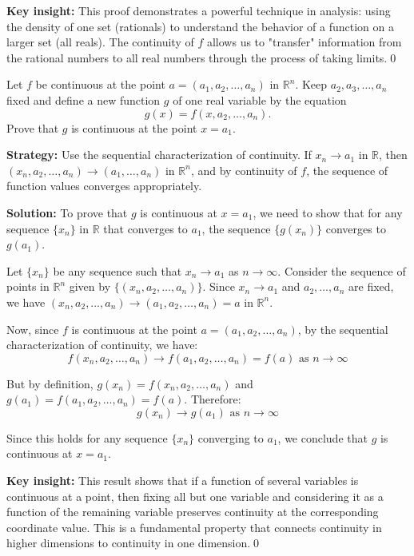 \medskip\noindent\textbf{Key insight:} This proof demonstrates a powerful technique in analysis: using the density of one set (rationals) to understand the behavior of a function on a larger set (all reals). The continuity of $f$ allows us to "transfer" information from the rational numbers to all real numbers through the process of taking limits.\qed



\begin{problembox}
\begin{problemstatement}
Let \( f \) be continuous at the point \( a = (a_1, a_2, \ldots, a_n) \) in \( \mathbb{R}^n \). Keep \( a_2, a_3, \ldots, a_n \) fixed and define a new function \( g \) of one real variable by the equation
\[g(x) = f(x, a_2, \ldots, a_n).\]
Prove that \( g \) is continuous at the point \( x = a_1 \).
\end{problemstatement}
\end{problembox}

\noindent\textbf{Strategy:} Use the sequential characterization of continuity. If $x_n \to a_1$ in $\mathbb{R}$, then $(x_n, a_2, \ldots, a_n) \to (a_1, \ldots, a_n)$ in $\mathbb{R}^n$, and by continuity of $f$, the sequence of function values converges appropriately.

\bigskip\noindent\textbf{Solution:}
To prove that $g$ is continuous at $x = a_1$, we need to show that for any sequence $\{x_n\}$ in $\mathbb{R}$ that converges to $a_1$, the sequence $\{g(x_n)\}$ converges to $g(a_1)$.

Let $\{x_n\}$ be any sequence such that $x_n \to a_1$ as $n \to \infty$. Consider the sequence of points in $\mathbb{R}^n$ given by $\{(x_n, a_2, \ldots, a_n)\}$. Since $x_n \to a_1$ and $a_2, \ldots, a_n$ are fixed, we have $(x_n, a_2, \ldots, a_n) \to (a_1, a_2, \ldots, a_n) = a$ in $\mathbb{R}^n$.

Now, since $f$ is continuous at the point $a = (a_1, a_2, \ldots, a_n)$, by the sequential characterization of continuity, we have:
\[f(x_n, a_2, \ldots, a_n) \to f(a_1, a_2, \ldots, a_n) = f(a) \text{ as } n \to \infty\]

But by definition, $g(x_n) = f(x_n, a_2, \ldots, a_n)$ and $g(a_1) = f(a_1, a_2, \ldots, a_n) = f(a)$. Therefore:
\[g(x_n) \to g(a_1) \text{ as } n \to \infty\]

Since this holds for any sequence $\{x_n\}$ converging to $a_1$, we conclude that $g$ is continuous at $x = a_1$.

\medskip\noindent\textbf{Key insight:} This result shows that if a function of several variables is continuous at a point, then fixing all but one variable and considering it as a function of the remaining variable preserves continuity at the corresponding coordinate value. This is a fundamental property that connects continuity in higher dimensions to continuity in one dimension.\qed



